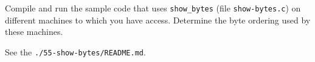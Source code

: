\documentclass[12pt]{article}
\newenvironment{ex}[2][Exercise]{\begin{trivlist}
		\item[\hskip \labelsep {\bfseries #1}\hskip \labelsep {\bfseries #2.}]}{\end{trivlist}}
\newenvironment{sol}[1][Solution]{\begin{trivlist}
		\item[\hskip \labelsep {\bfseries #1:}]}{\end{trivlist}}
\begin{document}
\begin{ex}{2.55}
	Compile and run the sample code that uses \texttt{show\_bytes} (file
	\texttt{show-bytes.c}) on different machines to which you have access.
	Determine the byte ordering used by these machines.
\end{ex}

\begin{sol}
	See the \texttt{./55-show-bytes/README.md}.
\end{sol}
\end{document}

